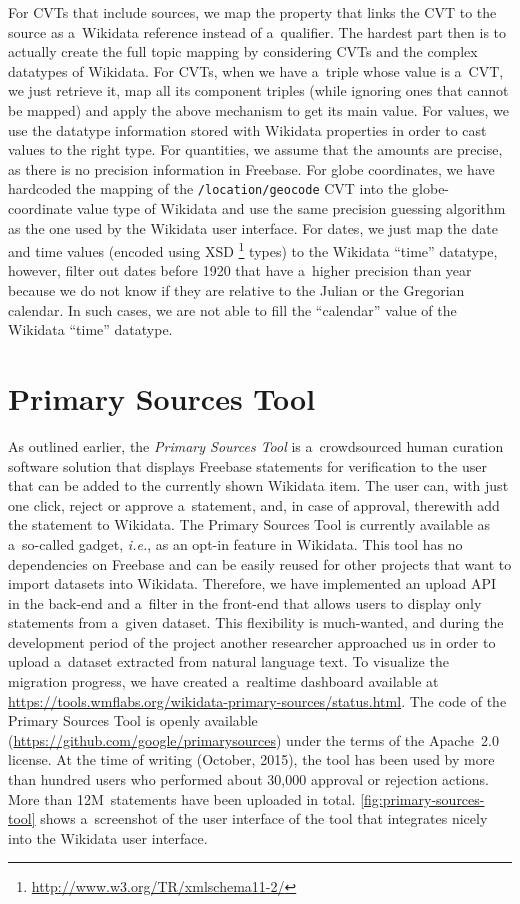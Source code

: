 \documentclass{sig-alternate}
\begin{document}
For CVTs that include sources, we map the property that links the CVT
to the source as a~Wikidata reference instead of a~qualifier.
The hardest part then is to actually create the full topic mapping
by considering CVTs and the complex datatypes of Wikidata.
For CVTs, when we have a~triple whose value is a~CVT, we just retrieve it,
map all its component triples (while ignoring ones that cannot be mapped)
and apply the above mechanism to get its main value.
For values, we use the datatype information stored with Wikidata properties
in order to cast values to the right type.
For quantities, we assume that the amounts are precise,
as there is no precision information in Freebase.
For globe coordinates, we have hardcoded the mapping of the \texttt{/location/geocode} CVT
into the globe-coordinate value type of Wikidata
and use the same precision guessing algorithm as the one used by the Wikidata user interface.
For dates, we just map the date and time values (encoded using XSD%
\footnote{\url{ http://www.w3.org/TR/xmlschema11-2/}} types)
to the Wikidata ``time'' datatype, however, filter out dates before 1920 that have
a~higher precision than year because we do not know
if they are relative to the Julian or the Gregorian calendar.
In such cases, we are not able to fill the ``calendar'' value of the Wikidata ``time'' datatype.

\section{Primary Sources Tool}\label{sec:primary-sources-tool}

As outlined earlier, the \emph{Primary Sources Tool} is a~crowdsourced human curation
software solution that displays Freebase statements
for verification to the user that can be added to the currently shown Wikidata item.
The user can, with just one click, reject or approve a~statement,
and, in case of approval, therewith add the statement to Wikidata.
The Primary Sources Tool is currently available as a~so-called gadget,
\emph{i.e.}, as an opt-in feature in Wikidata.
This tool has no dependencies on Freebase and can be easily reused for other projects
that want to import datasets into Wikidata.
Therefore, we have implemented an upload API in the back-end
and a~filter in the front-end that allows users to display only statements from a~given dataset.
This flexibility is much-wanted, and during the development period of the project
another researcher approached us in order to upload a~dataset extracted from natural language text.
To visualize the migration progress, we have created a~realtime dashboard
available at \url{https://tools.wmflabs.org/wikidata-primary-sources/status.html}.
The code of the Primary Sources Tool is openly available
(\url{https://github.com/google/primarysources}) under the terms of the Apache~2.0 license.
At the time of writing (October, 2015), the tool has been used by more than hundred users
who performed about 30,000 approval or rejection actions.
More than 12M~statements have been uploaded in total.
\autoref{fig:primary-sources-tool} shows a~screenshot of the user interface
of the tool that integrates nicely into the Wikidata user interface.
\end{document}
